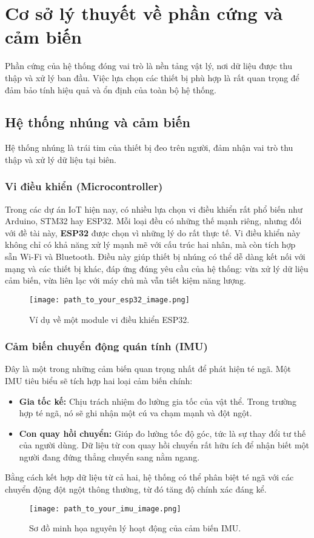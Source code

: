 \section{Cơ sở lý thuyết về phần cứng và cảm biến}

Phần cứng của hệ thống đóng vai trò là nền tảng vật lý, nơi dữ liệu được thu thập và xử lý ban đầu. Việc lựa chọn các thiết bị phù hợp là rất quan trọng để đảm bảo tính hiệu quả và ổn định của toàn bộ hệ thống.

\subsection{Hệ thống nhúng và cảm biến}

Hệ thống nhúng là trái tim của thiết bị đeo trên người, đảm nhận vai trò thu thập và xử lý dữ liệu tại biên.

\subsubsection{Vi điều khiển (Microcontroller)}
Trong các dự án IoT hiện nay, có nhiều lựa chọn vi điều khiển rất phổ biến như Arduino, STM32 hay ESP32. Mỗi loại đều có những thế mạnh riêng, nhưng đối với đề tài này, \textbf{ESP32} được chọn vì những lý do rất thực tế. Vi điều khiển này không chỉ có khả năng xử lý mạnh mẽ với cấu trúc hai nhân, mà còn tích hợp sẵn Wi-Fi và Bluetooth. Điều này giúp thiết bị nhúng có thể dễ dàng kết nối với mạng và các thiết bị khác, đáp ứng đúng yêu cầu của hệ thống: vừa xử lý dữ liệu cảm biến, vừa liên lạc với máy chủ mà vẫn tiết kiệm năng lượng.
\begin{figure}[h]
    \centering
    \texttt{[image: path\_to\_your\_esp32\_image.png]}
    \caption{Ví dụ về một module vi điều khiển ESP32.}
    \label{fig:esp32}
\end{figure}

\subsubsection{Cảm biến chuyển động quán tính (IMU)}
Đây là một trong những cảm biến quan trọng nhất để phát hiện té ngã. Một IMU tiêu biểu sẽ tích hợp hai loại cảm biến chính:
\begin{itemize}
    \item \textbf{Gia tốc kế:} Chịu trách nhiệm đo lường gia tốc của vật thể. Trong trường hợp té ngã, nó sẽ ghi nhận một cú va chạm mạnh và đột ngột.
    \item \textbf{Con quay hồi chuyển:} Giúp đo lường tốc độ góc, tức là sự thay đổi tư thế của người dùng. Dữ liệu từ con quay hồi chuyển rất hữu ích để nhận biết một người đang đứng thẳng chuyển sang nằm ngang.
\end{itemize}
Bằng cách kết hợp dữ liệu từ cả hai, hệ thống có thể phân biệt té ngã với các chuyển động đột ngột thông thường, từ đó tăng độ chính xác đáng kể.
\begin{figure}[h]
    \centering
    \texttt{[image: path\_to\_your\_imu\_image.png]}
    \caption{Sơ đồ minh họa nguyên lý hoạt động của cảm biến IMU.}
    \label{fig:imu_working_principle}
\end{figure}

